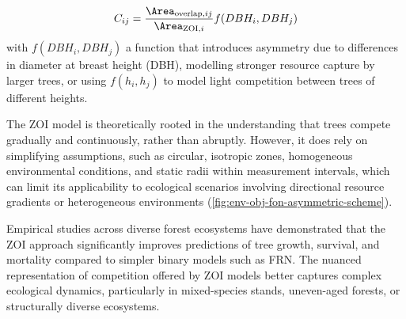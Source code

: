 \begin{align}
C_{ij} = \frac{ \Area_{\text{overlap}, ij} }{ \Area_{\text{ZOI}, i} } f(DBH_i, DBH_j)
\end{align}
with $f(DBH_i, DBH_j)$ a function that introduces asymmetry due to differences in diameter at breast height (DBH), modelling stronger resource capture by larger trees, or using $f(h_i, h_j)$ to model light competition between trees of different heights.

The ZOI model is theoretically rooted in the understanding that trees compete gradually and continuously, rather than abruptly. However, it does rely on simplifying assumptions, such as circular, isotropic zones, homogeneous environmental conditions, and static radii within measurement intervals, which can limit its applicability to ecological scenarios involving directional resource gradients or heterogeneous environments (\cref{fig:env-obj-fon-asymmetric-scheme}).

Empirical studies across diverse forest ecosystems have demonstrated that the ZOI approach significantly improves predictions of tree growth, survival, and mortality compared to simpler binary models such as FRN. The nuanced representation of competition offered by ZOI models better captures complex ecological dynamics, particularly in mixed-species stands, uneven-aged forests, or structurally diverse ecosystems.


